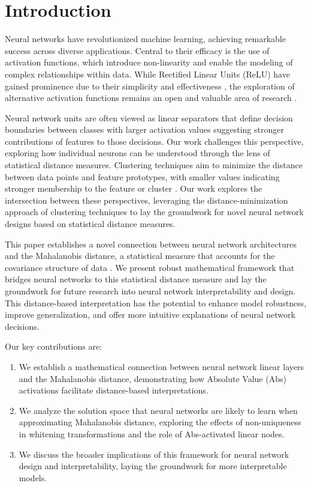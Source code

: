 \section{Introduction}

Neural networks have revolutionized machine learning, achieving remarkable success across diverse applications. Central to their efficacy is the use of activation functions, which introduce non-linearity and enable the modeling of complex relationships within data. While Rectified Linear Units (ReLU) have gained prominence due to their simplicity and effectiveness \citep{nair2010rectified}, the exploration of alternative activation functions remains an open and valuable area of research \citep{ramachandran2017searching}.

Neural network units are often viewed as linear separators that define decision boundaries between classes \citep{minsky1969perceptrons} with larger activation values suggesting stronger contributions of features to those decisions. Our work challenges this perspective, exploring how individual neurons can be understood through the lens of statistical distance measures. Clustering techniques aim to minimize the distance between data points and feature prototypes, with smaller values indicating stronger membership to the feature or cluster \citep{macqueen1967methods}. Our work explores the intersection between these perspectives, leveraging the distance-minimization approach of clustering techniques to lay the groundwork for novel neural network designs based on statistical distance measures.

This paper establishes a novel connection between neural network architectures and the Mahalanobis distance, a statistical measure that accounts for the covariance structure of data \citep{mahalanobis1936generalized}. We present robust mathematical framework that bridges neural networks to this statistical distance measure and lay the groundwork for future research into neural network interpretability and design. This distance-based interpretation has the potential to enhance model robustness, improve generalization, and offer more intuitive explanations of neural network decisions.

Our key contributions are:

\begin{enumerate}
    \item We establish a mathematical connection between neural network linear layers and the Mahalanobis distance, demonstrating how Absolute Value (Abs) activations facilitate distance-based interpretations.
    \item We analyze the solution space that neural networks are likely to learn when approximating Mahalanobis distance, exploring the effects of non-uniqueness in whitening transformations and the role of Abs-activated linear nodes.
    \item We discuss the broader implications of this framework for neural network design and interpretability, laying the groundwork for more interpretable models.
\end{enumerate}
